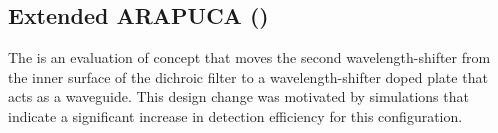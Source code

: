 

\subsection{Extended ARAPUCA ()}
\label{sec:xarapuca-valid}

The  is an evaluation of  concept that moves the second wavelength-shifter from the  inner surface of the dichroic filter to a wavelength-shifter doped plate that acts as a waveguide. This design change was motivated by  simulations that indicate a significant increase in detection efficiency for this configuration. 

